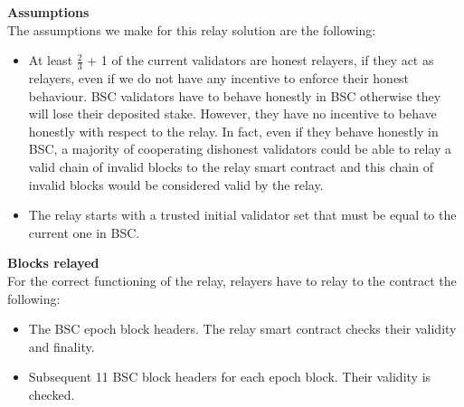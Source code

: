 \noindent
\textbf{Assumptions}\\
The assumptions we make for this relay solution are the following: 
\begin{itemize}
\item At least $\frac{2}{3}$ + 1 of the current validators are honest relayers, if they act as relayers, even if we do not have any incentive to enforce their honest behaviour. BSC validators have to behave honestly in BSC otherwise they will lose their deposited stake. However, they have no incentive to behave honestly with respect to the relay. In fact, even if they behave honestly in BSC, a majority of cooperating dishonest validators could be able to relay a valid chain of invalid blocks to the relay smart contract and this chain of invalid blocks would be considered valid by the relay. 
\item The relay starts with a trusted initial validator set that must be equal to the current one in BSC.
\end{itemize}
\noindent
\textbf{Blocks relayed}\\
For the correct functioning of the relay, relayers have to relay to the contract the following:  
\begin{itemize}
    \item The BSC epoch block headers. The relay smart contract checks their validity and finality.%
    \item Subsequent 11 BSC block headers for each epoch block. Their validity is checked. 
\end{itemize}

